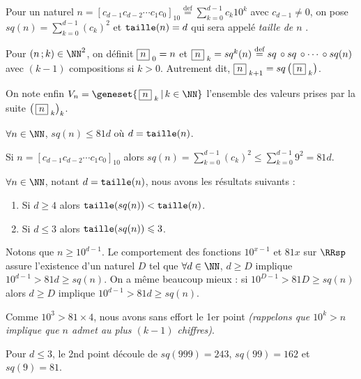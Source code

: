 Pour un naturel 
$\displaystyle      n = \left[ c_{d-1} c_{d-2} \cdots c_1 c_0 \right]_{10} 
\stackrel{\text{def}}{=} \sum_{k=0}^{d-1} c_k 10^k$
avec $c_{d-1} \neq 0$,
on pose
$\displaystyle sq(n) = \sum_{k=0}^{d-1} (c_k)^2$
et
$\operatorname{\text{\normalfont\texttt{taille}}}(n) = d$ qui sera appelé \emph{\og taille de $n$ \fg}.

\medskip

Pour $(n \,; k) \in \NN^2$, on définit 
$  \fbox{$n$}_{\,\,0} = n$
et
$  \fbox{$n$}_{\,\,k} = sq^k(n)
\stackrel{\text{def}}{=} sq \,\circ sq \,\circ \cdots \,\circ sq(n)$ avec $(k-1)$ compositions si $k > 0$.
Autrement dit,
$\fbox{$n$}_{\,\,k+1} = sq \left( \, \fbox{$n$}_{\,\,k} \right)$.

\medskip

On note enfin
$V_n = \geneset{ \, \sqseq{n}{k} \, | \, k \in \NN }$
l'ensemble des valeurs prises par la suite $\left( \, \fbox{$n$}_{\,\,k} \right)_k$.



\bigskip

\begin{fact}
	$\forall n \in \NN$, $sq(n) \leqslant 81 d$ où $d = \operatorname{\text{\normalfont\texttt{taille}}}(n)$.
\end{fact}

\begin{proof*}
	Si $n = [c_{d-1} c_{d-2} \cdots c_1 c_0]_{10}$
	alors 
	$\displaystyle sq(n) = \sum_{k=0}^{d-1} (c_k)^2 \leqslant \sum_{k=0}^{d-1} 9^2 = 81 d $.
\end{proof*}


\medskip

\begin{fact}
	$\forall n \in \NN$, notant $d = \operatorname{\text{\normalfont\texttt{taille}}}(n)$, nous avons les résultats suivants :
	
	\begin{enumerate}
		\item Si $d \geqslant 4$ alors $\operatorname{\text{\normalfont\texttt{taille}}}(sq(n)) < \operatorname{\text{\normalfont\texttt{taille}}}(n)$.
		
		\item Si $d \leqslant 3$ alors $\operatorname{\text{\normalfont\texttt{taille}}}(sq(n)) \leqslant 3$.
	\end{enumerate}
\end{fact}

\begin{proof*}
	Notons que $n \geqslant 10^{d-1}$.
	Le comportement des fonctions $10^{x-1}$ et $81x$ sur $\RRsp$ assure l'existence d'un naturel $D$ tel que $\forall d \in \NN$, $d \geqslant D$ implique $10^{d-1} > 81d \geqslant sq(n)$. On a même beaucoup mieux : si $10^{D-1} > 81D \geqslant sq(n)$ alors $d \geqslant D$ implique $10^{d-1} > 81d \geqslant sq(n)$.
	
	\medskip
	
	Comme $10^3 > 81 \times 4$, nous avons sans effort le 1er point \emph{(rappelons que $10^k > n$ implique que $n$ admet au plus $(k-1)$ chiffres)}.
	
	\medskip
	
	Pour $d \leqslant 3$, le 2nd point découle de $sq(999) = 243$, $sq(99) = 162$ et $sq(9) = 81$.
\end{proof*}



